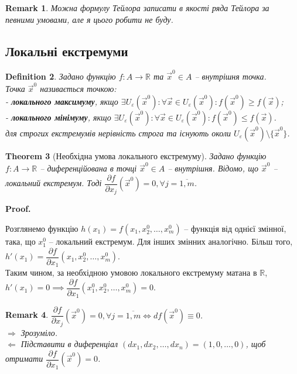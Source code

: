 \documentclass[a4paper, 10pt]{article}
\makeatletter
\def\departial#1#2{\dfrac{\partial {#1}}{\partial {#2}}}
\def\qed{$\blacksquare$}
\def\rightproof{$\boxed{\Rightarrow}$ }
\def\leftproof{$\boxed{\Leftarrow}$ }
\theoremstyle{theoremdd}
\newtheorem{theorem}{Theorem}[subsection]
\theoremstyle{theoremdd}
\theoremstyle{theoremdd}
\newtheorem{definition}[theorem]{Definition}
\theoremstyle{theoremdd}
\theoremstyle{theoremdd}
\theoremstyle{theoremdd}
\theoremstyle{theoremdd}
\newtheorem{remark}[theorem]{Remark}
\theoremstyle{theoremdd}
\theoremstyle{theoremdd}
\renewenvironment{proof}[1][Proof.\\]{\par
\pushQED{\hfill \qed}%
\normalfont \topsep6\p@\@plus6\p@\relax
\trivlist
\item\relax
{\bfseries
#1\@addpunct{.}}\hspace\labelsep\ignorespaces
}{%
\popQED\endtrivlist\@endpefalse
}
\makeatother
\begin{document}
\begin{remark}
Можна формулу Тейлора записати в якості ряда Тейлора за певними умовами, але я цього робити не буду.
\end{remark}

\subsection{Локальні екстремуми}
\begin{definition}
Задано функцію $f\colon A\to \mathbb{R}$ та $\vec{x}^0 \in A$ -- внутрішня точка.\\
Точка $\vec{x}^0$ називається точкою:\\
- \textbf{локального максимуму}, якщо $\exists U_{\varepsilon}(\vec{x}^0): \forall \vec{x} \in U_{\varepsilon}(\vec{x}^0): f(\vec{x}^0) \geq f(\vec{x})$;\\
- \textbf{локального мінімуму}, якщо $\exists U_{\varepsilon}(\vec{x}^0): \forall \vec{x} \in U_{\varepsilon}(\vec{x}^0): f(\vec{x}^0) \leq f(\vec{x})$.\\
для строгих екстремумів нерівність строга та існують околи $U_\varepsilon(\vec{x}^0) \setminus \{\vec{x}^0\}$.
\end{definition}

\begin{theorem}[Необхідна умова локального екстремуму]
Задано функцію $f\colon A \to \mathbb{R}$ -- диференційована в точці $\vec{x}^0 \in A$ -- внутрішня. Відомо, що $\vec{x}^0$ -- локальний екстремум. Тоді $\departial{f}{x_j}(\vec{x}^0) = 0, \forall j=\overline{1,m}$.
\end{theorem}


\begin{proof}
Розглянемо функцію $h(x_1) = f(x_1,x_2^0,\dots,x_m^0)$ -- функція від однієї змінної, така, що $x_1^0$ -- локальний екстремум. Для інших змінних аналогічно. Більш того, $h'(x_1) = \departial{f}{x_1}(x_1,x_2^0,\dots,x_m^0)$.\\
Таким чином, за необхідною умовою локального екстремуму матана в $\mathbb{R}$, \\ $h'(x_1) = 0 \implies \departial{f}{x_1}(x_1^0,x_2^0,\dots,x_m^0) = 0$.
\end{proof}

\begin{remark}
$\departial{f}{x_j}(\vec{x}^0) = 0, \forall j = \overline{1,m} \iff df(\vec{x}^0) \equiv 0$.\\
\rightproof Зрозуміло.\\
\leftproof Підставити в диференціал $(dx_1,dx_2,\dots,dx_n) = (1,0,\dots,0)$, щоб отримати $\departial{f}{x_1}(\vec{x}^0)=0$.
\end{remark}
\end{document}

